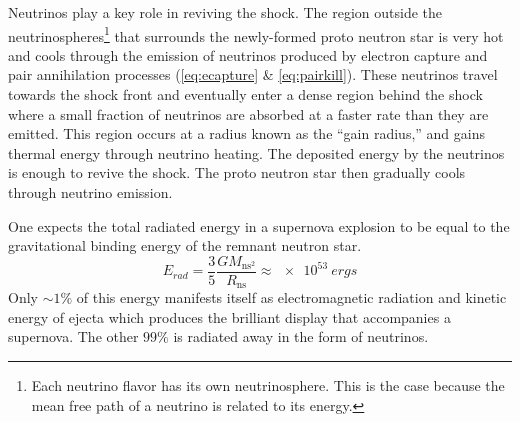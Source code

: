 		Neutrinos play a key role in reviving the shock. The region outside the neutrinospheres\footnote{Each neutrino flavor has its own neutrinosphere. This is the case because the mean free path of a neutrino is related to its energy.} that surrounds the newly-formed proto neutron star is very hot and cools through the emission of neutrinos produced by electron capture and pair annihilation processes (\EQS \ref{eq:ecapture} \& \ref{eq:pairkill}). These neutrinos travel towards the shock front and eventually enter a dense region behind the shock where a small fraction of neutrinos are absorbed at a faster rate than they are emitted. This region occurs at a radius known as the ``gain radius,'' and gains thermal energy through neutrino heating. The deposited energy by the neutrinos is enough to revive the shock. The proto neutron star then gradually cools through neutrino emission.

		One expects the total radiated energy in a supernova explosion to be equal to the gravitational binding energy of the remnant neutron star. 
		\begin{equation}
			E_{rad} = \frac{3}{5} \frac{G M_{\text{ns}^2}}{R_{\text{ns}}} \approx \SI[mode=text]{e53}{ergs}
		\end{equation}
		Only $\sim 1\%$ of this energy manifests itself as electromagnetic radiation and kinetic energy of ejecta which produces the brilliant display that accompanies a supernova. The other $99\%$ is radiated away in the form of neutrinos.

